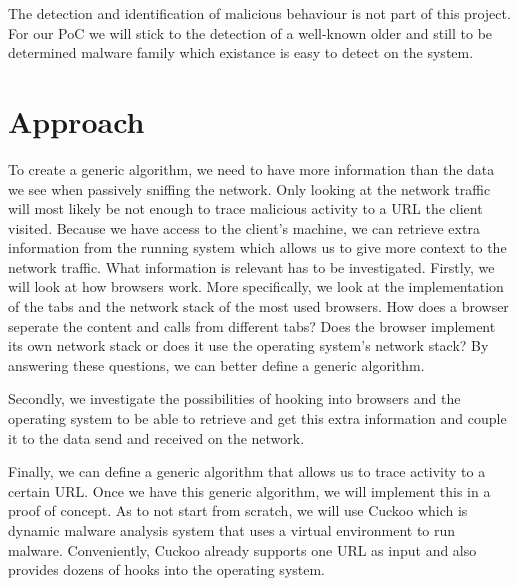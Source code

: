 \documentclass{scrartcl}
\begin{document}
The detection and identification of malicious behaviour is not part of this project. For our PoC we will stick to the detection of a well-known older and still to be determined malware family which existance is easy to detect on the system. 



\section{Approach}

To create a generic algorithm, we need to have more information than the data we see when passively sniffing the network. Only looking at the network traffic will most likely be not enough to trace malicious activity to a URL the client visited. Because we have access to the client's machine, we can retrieve extra information from the running system which allows us to give more context to the network traffic. What information is relevant has to be investigated. Firstly, we will look at how browsers work. More specifically, we look at the implementation of the tabs and the network stack of the most used browsers. How does a browser seperate the content and calls from different tabs? Does the browser implement its own network stack or does it use the operating system's network stack? By answering these questions, we can better define a generic algorithm.

Secondly, we investigate the possibilities of hooking into browsers and the operating system to be able to retrieve and get this extra information and couple it to the data send and received on the network.

Finally, we can define a generic algorithm that allows us to trace activity to a certain URL. Once we have this generic algorithm, we will implement this in a proof of concept. As to not start from scratch, we will use Cuckoo which is dynamic malware analysis system that uses a virtual environment to run malware. Conveniently, Cuckoo already supports one URL as input and also provides dozens of hooks into the operating system. 
\end{document}
